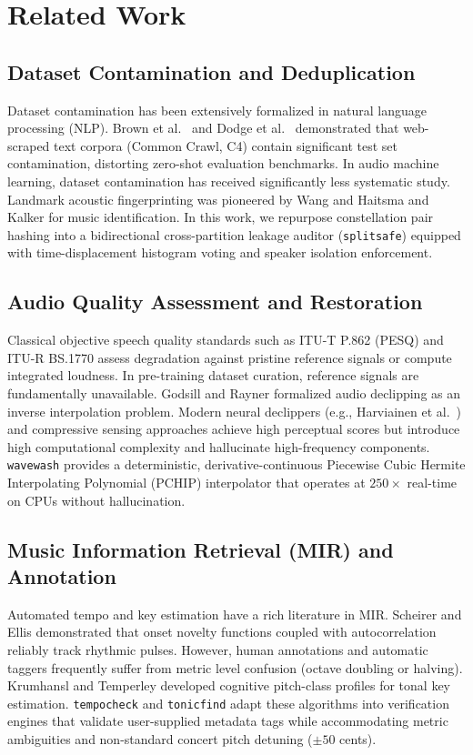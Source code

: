 \documentclass[10pt,journal,compsoc]{IEEEtran}
\begin{document}
\section{Related Work}
\subsection{Dataset Contamination and Deduplication}
Dataset contamination has been extensively formalized in natural language processing (NLP). Brown et al.\ \cite{brown2020gpt3} and Dodge et al.\ \cite{dodge2021c4} demonstrated that web-scraped text corpora (Common Crawl, C4) contain significant test set contamination, distorting zero-shot evaluation benchmarks. In audio machine learning, dataset contamination has received significantly less systematic study. Landmark acoustic fingerprinting was pioneered by Wang \cite{wang2003industrial} and Haitsma and Kalker \cite{haitsma2002highly} for music identification. In this work, we repurpose constellation pair hashing into a bidirectional cross-partition leakage auditor (\texttt{splitsafe}) equipped with time-displacement histogram voting and speaker isolation enforcement.

\subsection{Audio Quality Assessment and Restoration}
Classical objective speech quality standards such as ITU-T P.862 (PESQ) \cite{itu2001pesq} and ITU-R BS.1770 \cite{itu2015bs1770} assess degradation against pristine reference signals or compute integrated loudness. In pre-training dataset curation, reference signals are fundamentally unavailable. Godsill and Rayner \cite{godsill1998digital} formalized audio declipping as an inverse interpolation problem. Modern neural declippers (e.g., Harviainen et al.\ \cite{harviainen2021speech}) and compressive sensing approaches \cite{adler2012audio} achieve high perceptual scores but introduce high computational complexity and hallucinate high-frequency components. \texttt{wavewash} provides a deterministic, derivative-continuous Piecewise Cubic Hermite Interpolating Polynomial (PCHIP) interpolator that operates at $250\times$ real-time on CPUs without hallucination.

\subsection{Music Information Retrieval (MIR) and Annotation}
Automated tempo and key estimation have a rich literature in MIR. Scheirer \cite{scheirer1998tempo} and Ellis \cite{ellis2007beat} demonstrated that onset novelty functions coupled with autocorrelation reliably track rhythmic pulses. However, human annotations and automatic taggers frequently suffer from metric level confusion (octave doubling or halving). Krumhansl \cite{krumhansl1990cognitive} and Temperley \cite{temperley1999whats} developed cognitive pitch-class profiles for tonal key estimation. \texttt{tempocheck} and \texttt{tonicfind} adapt these algorithms into verification engines that validate user-supplied metadata tags while accommodating metric ambiguities and non-standard concert pitch detuning ($\pm 50$ cents).
\end{document}
